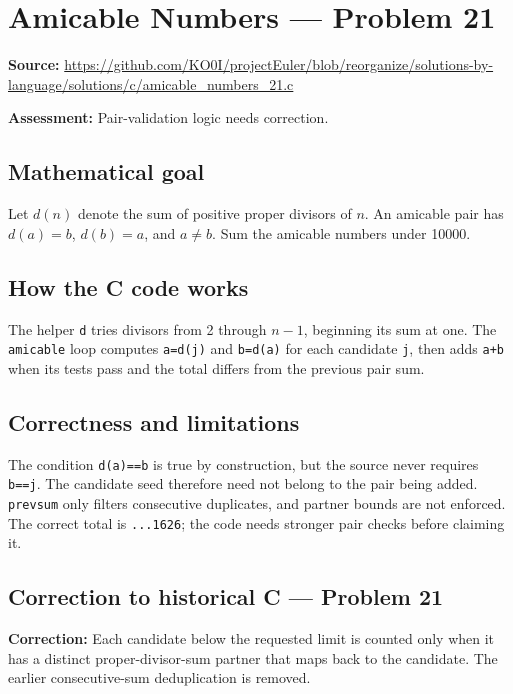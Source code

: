 \section{Amicable Numbers --- Problem 21}
\label{prob:21}
\noindent\textbf{Source:} \url{https://github.com/KO0I/projectEuler/blob/reorganize/solutions-by-language/solutions/c/amicable_numbers_21.c}

\noindent\textbf{Assessment:} Pair-validation logic needs correction.

\subsection*{Mathematical goal}
Let \(d(n)\) denote the sum of positive proper divisors of \(n\). An amicable pair has \(d(a)=b\), \(d(b)=a\), and \(a\ne b\). Sum the amicable numbers under 10000.

\subsection*{How the C code works}
The helper \verb|d| tries divisors from 2 through \(n-1\), beginning its sum at one. The \verb|amicable| loop computes \verb|a=d(j)| and \verb|b=d(a)| for each candidate \verb|j|, then adds \verb|a+b| when its tests pass and the total differs from the previous pair sum.

\subsection*{Correctness and limitations}
The condition \verb|d(a)==b| is true by construction, but the source never requires \verb|b==j|. The candidate seed therefore need not belong to the pair being added. \verb|prevsum| only filters consecutive duplicates, and partner bounds are not enforced. The correct total is \texttt{...1626}; the code needs stronger pair checks before claiming it.


\subsection*{Correction to historical C --- Problem 21}
{\color{red}\textbf{Correction:} Each candidate below the requested limit is counted only when it has a distinct proper-divisor-sum partner that maps back to the candidate. The earlier consecutive-sum deduplication is removed.}
